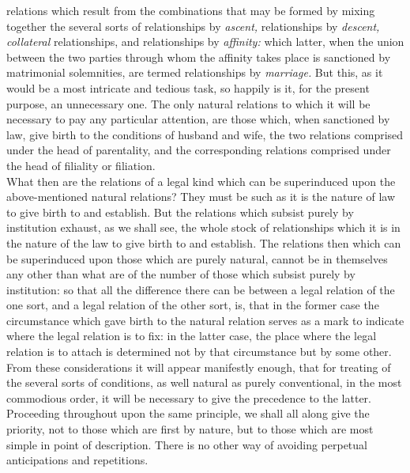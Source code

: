 \documentclass[12pt]{report}
\begin{document}
relations which result from the combinations that may be formed by
mixing together the several sorts of relationships by \emph{ascent,}
relationships by \emph{descent, collateral} relationships, and
relationships by \emph{affinity:} which latter, when the union between
the two parties through whom the affinity takes place is sanctioned by
matrimonial solemnities, are termed relationships by \emph{marriage.}
But this, as it would be a most intricate and tedious task, so happily
is it, for the present purpose, an unnecessary one. The only natural
relations to which it will be necessary to pay any particular attention,
are those which, when sanctioned by law, give birth to the conditions of
husband and wife, the two relations comprised under the head of
parentality, and the corresponding relations comprised under the head of
filiality or filiation.\\
What then are the relations of a legal kind which can be superinduced
upon the above-mentioned natural relations? They must be such as it is
the nature of law to give birth to and establish. But the relations
which subsist purely by institution exhaust, as we shall see, the whole
stock of relationships which it is in the nature of the law to give
birth to and establish. The relations then which can be superinduced
upon those which are purely natural, cannot be in themselves any other
than what are of the number of those which subsist purely by
institution: so that all the difference there can be between a legal
relation of the one sort, and a legal relation of the other sort, is,
that in the former case the circumstance which gave birth to the natural
relation serves as a mark to indicate where the legal relation is to
fix: in the latter case, the place where the legal relation is to attach
is determined not by that circumstance but by some other. From these
considerations it will appear manifestly enough, that for treating of
the several sorts of conditions, as well natural as purely conventional,
in the most commodious order, it will be necessary to give the
precedence to the latter. Proceeding throughout upon the same principle,
we shall all along give the priority, not to those which are first by
nature, but to those which are most simple in point of description.
There is no other way of avoiding perpetual anticipations and
repetitions.
\end{document}
